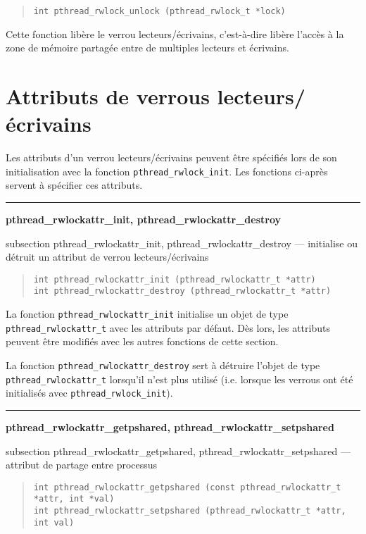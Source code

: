 \documentclass [twoside] {report}
\newcommand {\primitive} [1]
    {
	{\large \bf #1}
	\addcontentsline {toc} {subsection} {#1}
    }
\newcommand {\separation}
    {
	\vspace {7mm}
	\nopagebreak
	\hrule
    }
\begin{document}
\begin {quote}
\begin {verbatim}
int pthread_rwlock_unlock (pthread_rwlock_t *lock)
\end{verbatim}
\end {quote}

Cette fonction libère le verrou lecteurs/écrivains, c'est-à-dire
libère l'accès à la zone de mémoire partagée entre de multiples
lecteurs et écrivains.


\section {Attributs de verrous lecteurs/écrivains}

Les attributs d'un verrou lecteurs/écrivains peuvent
être spécifiés lors de son initialisation avec la fonction
\verb|pthread_rwlock_init|. Les fonctions ci-après servent à spécifier
ces attributs.

\separation
\primitive {pthread\_rwlockattr\_init, pthread\_rwlockattr\_destroy} ---
initialise ou détruit un attribut de verrou lecteurs/écrivains

\begin {quote}
\begin {verbatim}
int pthread_rwlockattr_init (pthread_rwlockattr_t *attr)
int pthread_rwlockattr_destroy (pthread_rwlockattr_t *attr)
\end{verbatim}
\end {quote}

La fonction \verb|pthread_rwlockattr_init| initialise un objet de type
\verb|pthread_rwlockattr_t| avec les attributs par défaut. Dès lors,
les attributs peuvent être modifiés avec les autres fonctions de
cette section.

La fonction \verb|pthread_rwlockattr_destroy| sert à détruire
l'objet de type \verb|pthread_rwlockattr_t| lorsqu'il n'est plus
utilisé (i.e.  lorsque les verrous ont été initialisés avec
\verb|pthread_rwlock_init|).


\separation
\primitive {pthread\_rwlockattr\_getpshared, pthread\_rwlockattr\_setpshared} --- attribut de partage entre processus

\begin {quote}
\begin {verbatim}
int pthread_rwlockattr_getpshared (const pthread_rwlockattr_t *attr, int *val)
int pthread_rwlockattr_setpshared (pthread_rwlockattr_t *attr, int val)
\end{verbatim}
\end {quote}
\end{document}

